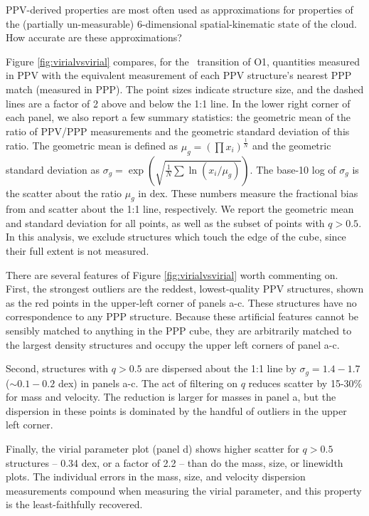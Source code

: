 PPV-derived properties are most often used as approximations for properties of the (partially un-measurable) 6-dimensional spatial-kinematic state of the cloud. How accurate are these approximations?

Figure \ref{fig:virialvsvirial} compares, for the \coc\, transition of O1, quantities measured in PPV with the equivalent measurement of each PPV structure's nearest PPP match (measured in PPP). The point sizes indicate structure size, and the dashed lines are a factor of
2 above and below the 1:1 line. In the lower right corner of each panel, we also report a few summary statistics: the geometric mean of the ratio of PPV/PPP measurements and the geometric standard deviation of this ratio. The geometric mean is defined as $\mu_g = \left(\prod{x_i}\right)^{\frac1{N}}$ and the geometric standard deviation as $\sigma_g = \exp{\left(\sqrt{\frac1{N} \sum{\ln(x_i / \mu_g)}}\right)}$. The base-10 log of $\sigma_g$ is the scatter about the ratio $\mu_g$ in dex. These numbers measure the fractional bias from and scatter about the 1:1 line, respectively. We report the geometric mean and standard deviation for all points, as well as the subset of points with $q > 0.5$. In this analysis, we exclude structures which touch the edge of the cube, since their full extent is not measured.

There are several features of Figure \ref{fig:virialvsvirial} worth commenting on. First, the strongest outliers are the reddest, lowest-quality PPV structures, shown as the red points in the upper-left corner of panels a-c. These structures have no correspondence to any PPP structure. Because these artificial features cannot be sensibly matched to anything in the PPP cube, they are arbitrarily matched to the largest density structures and occupy the upper left corners of panel a-c.

Second, structures with $q>0.5$ are dispersed about the 1:1 line by $\sigma_g=1.4-1.7$ ($\sim 0.1-0.2$ dex) in panels a-c. The act of filtering on $q$ reduces scatter by 15-30\% for mass and velocity. The reduction is larger for masses in panel a, but the dispersion in these points is dominated by the handful of outliers in the upper left corner.

Finally, the virial parameter plot (panel d) shows higher scatter for $q > 0.5$ structures  -- 0.34 dex, or a  factor of 2.2 -- than do the mass, size, or linewidth plots. The individual errors in the mass, size, and velocity dispersion measurements compound when measuring the virial parameter, and this property is the least-faithfully recovered.

